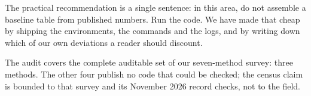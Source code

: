 \documentclass[10pt,twocolumn]{article}
\begin{document}
The practical recommendation is a single sentence: in this area, do not assemble a baseline table from
published numbers. Run the code. We have made that cheap by shipping the environments, the commands
and the logs, and by writing down which of our own deviations a reader should discount.

The audit covers the complete auditable set of our seven-method survey: three methods. The other four
publish no code that could be checked; the census claim is bounded to that survey and its November
2026 record checks, not to the field.



\end{document}
